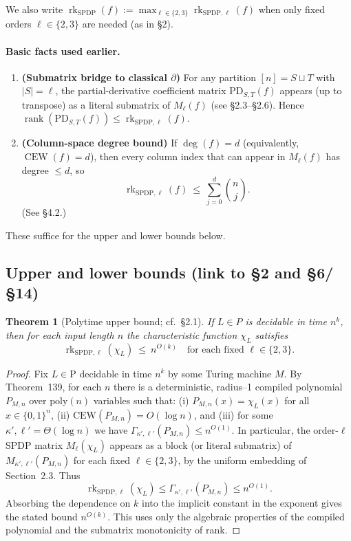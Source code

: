 \documentclass[12pt]{article}
\newcommand{\CEW}{\mathrm{CEW}}
\DeclareMathOperator{\rk}{rk}
\newtheorem{theorem}{Theorem}
\theoremstyle{definition}
\theoremstyle{definition}
\theoremstyle{remark}
\theoremstyle{remark}
\begin{document}
We also write $\operatorname{rk}_{\mathrm{SPDP}}(f):=\max_{\ell\in\{2,3\}}\operatorname{rk}_{\mathrm{SPDP},\ell}(f)$ when only fixed orders $\ell\in\{2,3\}$ are needed (as in \S2).

\paragraph{Basic facts used earlier.}

\begin{enumerate}
\item \textbf{(Submatrix bridge to classical $\partial$)} For any partition $[n]=S\sqcup T$ with $|S|=\ell$, the partial-derivative coefficient matrix $\mathrm{PD}_{S,T}(f)$ appears (up to transpose) as a literal submatrix of $M_\ell(f)$ (see \S2.3--\S2.6). Hence $\operatorname{rank}(\mathrm{PD}_{S,T}(f))\le\operatorname{rk}_{\mathrm{SPDP},\ell}(f)$.

\item \textbf{(Column-space degree bound)} If $\deg(f)=d$ (equivalently, $\operatorname{CEW}(f)=d$), then every column index that can appear in $M_\ell(f)$ has degree $\le d$, so
\[
\operatorname{rk}_{\mathrm{SPDP},\ell}(f) \ \le\ \sum_{j=0}^d \binom{n}{j}.
\]
(See \S4.2.)
\end{enumerate}

These suffice for the upper and lower bounds below.

\subsection{Upper and lower bounds (link to \S2 and \S6/\S14)}

\begin{theorem}[Polytime upper bound; cf.\ \S2.1]\label{thm:polytime-upper-bound}
If $L\in P$ is decidable in time $n^k$, then for each input length $n$ the characteristic function $\chi_L$ satisfies
\[
\operatorname{rk}_{\mathrm{SPDP},\ell}(\chi_L) \ \le\ n^{O(k)} \quad\text{for each fixed } \ell\in\{2,3\}.
\]
\end{theorem}

\begin{proof}
Fix $L \in \mathrm{P}$ decidable in time $n^k$ by some Turing machine $M$.
By Theorem~139, for each $n$ there is a deterministic, radius–1 compiled
polynomial $P_{M,n}$ over $\mathrm{poly}(n)$ variables such that:
(i) $P_{M,n}(x) = \chi_L(x)$ for all $x \in \{0,1\}^n$,
(ii) $\CEW(P_{M,n}) = O(\log n)$, and
(iii) for some $\kappa',\ell' = \Theta(\log n)$ we have
$\Gamma_{\kappa',\ell'}(P_{M,n}) \le n^{O(1)}$.
In particular, the order-$\ell$ SPDP matrix $M_{\ell}(\chi_L)$ appears as a
block (or literal submatrix) of $M_{\kappa',\ell'}(P_{M,n})$ for each fixed
$\ell \in \{2,3\}$, by the uniform embedding of Section~2.3.
Thus
\[
  \rk_{\mathrm{SPDP},\ell}(\chi_L)
  \le \Gamma_{\kappa',\ell'}(P_{M,n})
  \le n^{O(1)}.
\]
Absorbing the dependence on $k$ into the implicit constant in the exponent
gives the stated bound $n^{O(k)}$.  This uses only the algebraic properties
of the compiled polynomial and the submatrix monotonicity of rank.
\end{proof}
\end{document}
